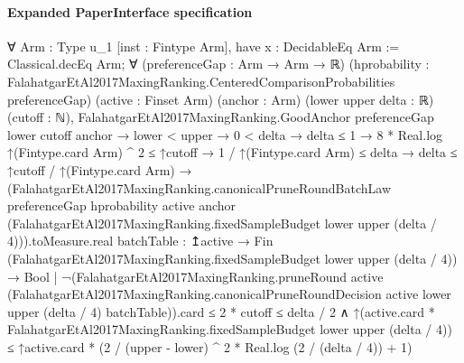 \documentclass[10pt]{article}
\begin{document}
\paragraph{Expanded PaperInterface specification}
\begin{ReviewVerbatim}
∀ {Arm : Type u_1} [inst : Fintype Arm],
  have x : DecidableEq Arm := Classical.decEq Arm;
  ∀ (preferenceGap : Arm → Arm → ℝ)
    (hprobability : FalahatgarEtAl2017MaxingRanking.CenteredComparisonProbabilities preferenceGap) (active : Finset Arm)
    (anchor : Arm) (lower upper delta : ℝ) (cutoff : ℕ),
    FalahatgarEtAl2017MaxingRanking.GoodAnchor preferenceGap lower cutoff anchor →
      lower < upper →
        0 < delta →
          delta ≤ 1 →
            8 * Real.log ↑(Fintype.card Arm) ^ 2 ≤ ↑cutoff →
              1 / ↑(Fintype.card Arm) ≤ delta →
                delta ≤ ↑cutoff / ↑(Fintype.card Arm) →
                  (FalahatgarEtAl2017MaxingRanking.canonicalPruneRoundBatchLaw preferenceGap hprobability active anchor
                              (FalahatgarEtAl2017MaxingRanking.fixedSampleBudget lower upper
                                (delta / 4))).toMeasure.real
                        {batchTable :
                          ↥active →
                            Fin (FalahatgarEtAl2017MaxingRanking.fixedSampleBudget lower upper (delta / 4)) → Bool |
                          ¬(FalahatgarEtAl2017MaxingRanking.pruneRound active
                                  (FalahatgarEtAl2017MaxingRanking.canonicalPruneRoundDecision active lower upper
                                    (delta / 4) batchTable)).card ≤
                              2 * cutoff} ≤
                      delta / 2 ∧
                    ↑(active.card * FalahatgarEtAl2017MaxingRanking.fixedSampleBudget lower upper (delta / 4)) ≤
                      ↑active.card * (2 / (upper - lower) ^ 2 * Real.log (2 / (delta / 4)) + 1)
\end{ReviewVerbatim}
\end{document}
